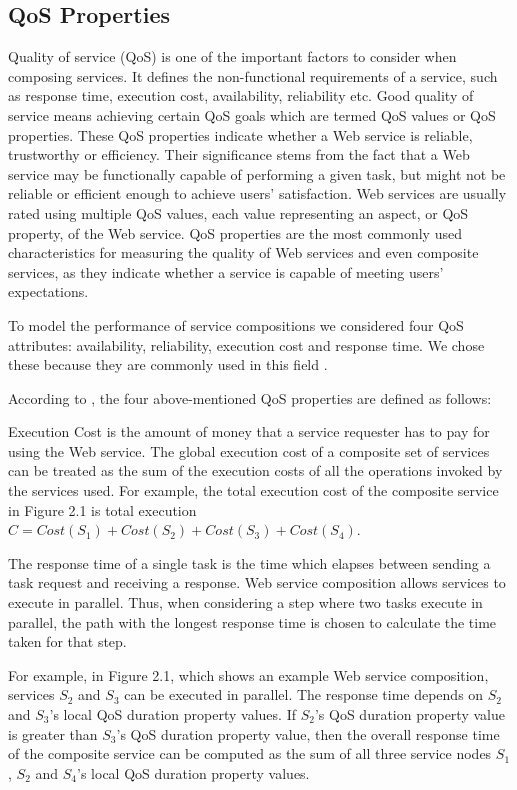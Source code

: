 \subsection{QoS Properties}
Quality of service (QoS) is one of the important factors to consider when composing services. It defines the non-functional requirements of a service, such as response time, execution cost, availability, reliability etc. Good quality of service means achieving certain QoS goals which are termed QoS values or QoS properties. These QoS properties indicate whether a Web service is reliable, trustworthy or efficiency. Their significance stems from the fact that a Web service may be functionally capable of performing a given task, but might not be reliable or efficient enough to achieve users' satisfaction. Web services are usually rated using multiple QoS values, each value representing an aspect, or QoS property, of the Web service. QoS properties are the most commonly used characteristics for measuring the quality of Web services and even composite services, as they indicate whether a service is capable of meeting users' expectations.\par

To model the performance of service compositions we considered four QoS attributes: availability, reliability, execution cost and response time. We chose these because they are commonly used in this field \cite{15,14,16,4}. \par
According to \cite{11,4,18}, the four above-mentioned QoS properties are defined as follows:\par
Execution Cost is the amount of money that a service requester has to pay for using the Web service. The global execution cost of a composite set of services can be treated as the sum of the execution costs of all the operations invoked by the services used. For example, the total execution cost of the composite service in Figure 2.1 is total execution $C = Cost(S_1) + Cost(S_2) + Cost(S_3) + Cost(S_4)$.\par
The response time of a single task is the time which elapses between sending a task request and receiving a response. Web service composition allows services to execute in parallel. Thus, when considering a step where two tasks execute in parallel, the path with the longest response time is chosen to calculate the time taken for that step.\par
For example, in Figure 2.1, which shows an example Web service composition, services $S_{2}$ and $S_{3}$ can be executed in parallel. The response time depends on $S_{2}$ and $S_{3}$'s local QoS duration property values. If $S_{2}$'s QoS duration property value is greater than $S_{3}$'s QoS duration property value, then the overall response time of the composite service can be computed as the sum of all three service nodes $S_{1}$, $S_{2}$ and $S_{4}$'s local QoS duration property values.\par

